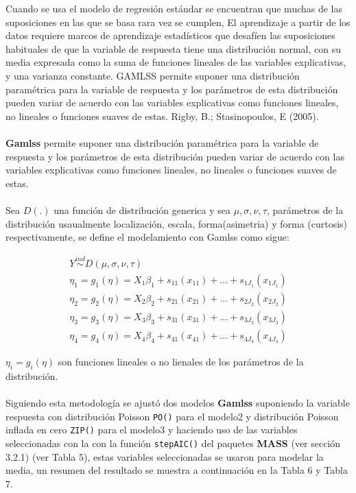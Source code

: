 \documentclass[11pt,twoside]{article}
\begin{document}
\noindent
Cuando se usa el modelo de regresión estándar se encuentran que muchas de las suposiciones en las que se basa rara vez se cumplen, El aprendizaje a partir de los datos requiere marcos de aprendizaje estadísticos que desafíen las suposiciones habituales de que la variable de respuesta tiene una distribución normal, con su media expresada como la suma de funciones lineales de las variables explicativas, y una varianza constante.
GAMLSS permite suponer una distribución paramétrica para la variable de respuesta y los parámetros de esta distribución pueden variar de acuerdo con las variables explicativas como funciones lineales, no lineales o funciones suaves de estas. Rigby, B.; Stasinopoulos, E (2005).
\\
\\
\textbf{Gamlss} permite suponer una distribución paramétrica para la variable de respuesta y los parámetros de esta distribución pueden variar de acuerdo con las variables explicativas como funciones lineales, no lineales o funciones suaves de estas.
\\
\\
Sea $D(.)$ una función de distribución generica y sea  $\mu, \sigma, \nu ,\tau $, parámetros de la distribución usaualmente localización, escala, forma(asimetria) y forma (curtosis) respectivamente, se define el modelamiento con Gamlss como sigue: 
\begin{center}
\begin{equation*}
\begin{split} 
Y\overset { ind }{ \sim  } D(\mu ,\sigma ,\nu ,\tau )\\ { \eta  }_{ 1 }={ g }_{ 1 }(\eta )={X }_{ 1 }{ \beta  }_{ 1 }+{ s }_{ 11 }({ x }_{ 11 })+...+{ s }_{ 1{ J }_{ 1 } }({ x }_{ 1{ J }_{ 1 } })\\ { \eta  }_{ 2 }={ g }_{ 2 }(\eta )={X}_{ 2 }{ \beta  }_{ 2 }+{ s }_{ 21 }({ x }_{ 21 })+...+{ s }_{ 2{ J }_{ 2 } }({x}_{ 2{ J }_{ 2 } })\\ { \eta  }_{ 3 }={ g }_{ 3 }(\eta )={X}_{ 3 }{ \beta  }_{ 3 }+{ s }_{ 31 }({ x }_{ 31 })+...+{ s }_{ 3{ J }_{ 3 } }({ x }_{ 3{ J }_{ 3 } })\\ { \eta  }_{ 4 }={ g }_{ 4 }(\eta )={ X  }_{ 4 }{ \beta  }_{ 4 }+{ s }_{ 41 }({ x }_{ 41 })+...+{ s }_{ 4{ J }_{ 4 } }({ x }_{ 4{ J }_{ 4 } })
\end{split}
\end{equation*}
\end{center}
${ \eta  }_{ i }={ g }_{ i }(\eta )$ son funciones lineales o no lienales de los parámetros de la distribución. 
\\
\\
Siguiendo esta metodología se ajustó dos modelos \textbf{Gamlss} suponiendo la variable respuesta con distribución Poisson \texttt{PO()} para el modelo2 y distribución  Poisson inflada en cero  \texttt{ZIP()} para el modelo3 y haciendo uso de las variables seleccionadas con la con la función \texttt{stepAIC()} del paquetes \textbf{MASS} (ver sección 3.2.1) (ver Tabla 5), estas variables seleccionadas se usaron para modelar la media, un resumen del resultado se muestra a continuación en la Tabla 6 y Tabla 7. 
\end{document}
